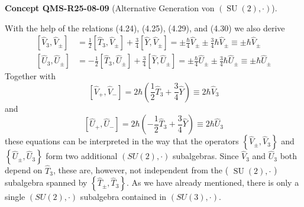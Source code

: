 \documentclass[10pt, letterpaper]{article}
\newcommand{\CustomHeading}[3]{%
  \par\medskip\noindent%
  \textbf{#1 #2} \textnormal{(#3)}.\enskip%
}
\newenvironment{CONC}[2]{\begin{unitbox}\CustomHeading{Concept}{#1}{#2}}{\end{unitbox}}
\begin{document}
\begin{CONC}{QMS-R25-08-09}{Alternative Generation von $(\operatorname{SU}(2), \cdot)$}
With the help of the relations (4.24), (4.25), (4.29), and (4.30) we also derive
$$
\begin{aligned}
{\left[\hat{V}_{3}, \hat{V}_{ \pm}\right] } & =\frac{1}{2}\left[\hat{T}_{3}, \hat{V}_{ \pm}\right]+\frac{3}{4}\left[\hat{Y}, \hat{V}_{ \pm}\right]= \pm \frac{\hbar}{4} \hat{V}_{ \pm} \pm \frac{3}{4} \hbar \hat{V}_{ \pm} \equiv \pm \hbar \hat{V}_{ \pm} \\
{\left[\hat{U}_{3}, \hat{U}_{ \pm}\right] } & =-\frac{1}{2}\left[\hat{T}_{3}, \hat{U}_{ \pm}\right]+\frac{3}{4}\left[\hat{Y}, \hat{U}_{ \pm}\right]= \pm \frac{\hbar}{4} \hat{U}_{ \pm} \pm \frac{3}{4} \hbar \hat{U}_{ \pm} \equiv \pm \hbar \hat{U}_{ \pm}
\end{aligned}
$$
Together with 
$$\left[\hat{V}_{+}, \hat{V}_{-}\right]=2 \hbar\left(\frac{1}{2} \hat{T}_3+\frac{3}{4} \hat{Y}\right) \equiv 2 \hbar \hat{V}_3$$
and 
$$\left[\hat{U}_{+}, \hat{U}_{-}\right]=2 \hbar\left(-\frac{1}{2} \hat{T}_3+\frac{3}{4} \hat{Y}\right) \equiv 2 \hbar \hat{U}_3$$
these equations can be interpreted in the way that the operators $\left\{\hat{V}_{ \pm}, \hat{V}_{3}\right\}$ and $\left\{\hat{U}_{ \pm}, \hat{U}_{3}\right\}$ form two additional $(S U(2), \cdot)$ subalgebras. Since $\hat{V}_{3}$ and $\hat{U}_{3}$ both depend on $\hat{T}_{3}$, these are, however, not independent from the ( $\operatorname{SU}(2), \cdot$ ) subalgebra spanned by $\left\{\hat{T}_{ \pm}, \hat{T}_{3}\right\}$. As we have already mentioned, there is only a single $(S U(2), \cdot)$ subalgebra contained in $(S U(3), \cdot)$.
\end{CONC}
\end{document}
